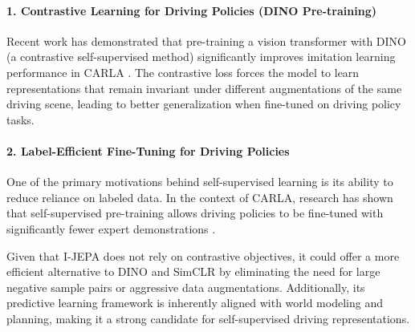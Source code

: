 \documentclass{article}
\begin{document}
\paragraph{1. Contrastive Learning for Driving Policies (DINO Pre-training)}
Recent work has demonstrated that pre-training a vision transformer with DINO (a contrastive self-supervised method) significantly improves imitation learning performance in CARLA \citep{juneja2024dino}. The contrastive loss forces the model to learn representations that remain invariant under different augmentations of the same driving scene, leading to better generalization when fine-tuned on driving policy tasks.

\paragraph{2. Label-Efficient Fine-Tuning for Driving Policies}
One of the primary motivations behind self-supervised learning is its ability to reduce reliance on labeled data. In the context of CARLA, research has shown that self-supervised pre-training allows driving policies to be fine-tuned with significantly fewer expert demonstrations \citep{wu2023policy}. 

Given that I-JEPA does not rely on contrastive objectives, it could offer a more efficient alternative to DINO and SimCLR by eliminating the need for large negative sample pairs or aggressive data augmentations. Additionally, its predictive learning framework is inherently aligned with world modeling and planning, making it a strong candidate for self-supervised driving representations.
\end{document}
